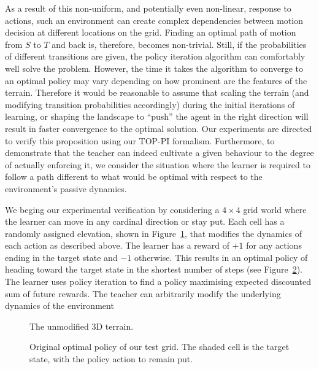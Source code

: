 As a result of this non-uniform, and potentially even non-linear,
response to actions, such an environment can create complex
dependencies between motion decision at different locations on the
grid. Finding an optimal path of motion from $S$ to $T$ and back is,
therefore, becomes non-trivial. Still, if the probabilities of
different transitions are given, the policy iteration algorithm can
comfortably well solve the problem. However, the time it takes the
algorithm to converge to an optimal policy may vary depending on how
prominent are the features of the terrain. Therefore it would be
reasonable to assume that scaling the terrain (and modifying
transition probabilities accordingly) during the initial iterations of
learning, or shaping the landscape to ``push'' the agent in the right
direction will result in faster convergence to the optimal
solution. Our experiments are directed to verify this proposition
using our TOP-PI formalism.  Furthermore, to demonstrate that the
teacher can indeed cultivate a given behaviour to the degree of actually 
enforcing it, we consider the situation where the learner is required
to follow a path different to what would be optimal with respect to
the environment's passive dynamics. %

We beging our experimental verification by considering a $4 \times 4$
grid world where the learner can move in any cardinal direction or
stay put.  Each cell has a randomly assigned elevation, shown in
Figure~\ref{probalt}, that modifies the dynamics of each action as
described above.  The learner has a reward of $+1$ for any actions
ending in the target state and $-1$ otherwise.  This results in an
optimal policy of heading toward the target state in the shortest
number of steps (see Figure~\ref{prevopt}).  The learner uses policy
iteration to find a policy maximising expected discounted sum of
future rewards. The teacher can arbitrarily modify the underlying
dynamics of the environment

\begin{figure}[ht]
\centerline{}
\caption{\label{probalt}The unmodified 3D terrain.}
\end{figure}

\begin{figure}[ht]
\centerline{}
\caption{\label{prevopt}Original optimal policy of our test grid.  The shaded cell is the target state, with the policy action to remain put.}
\end{figure}

